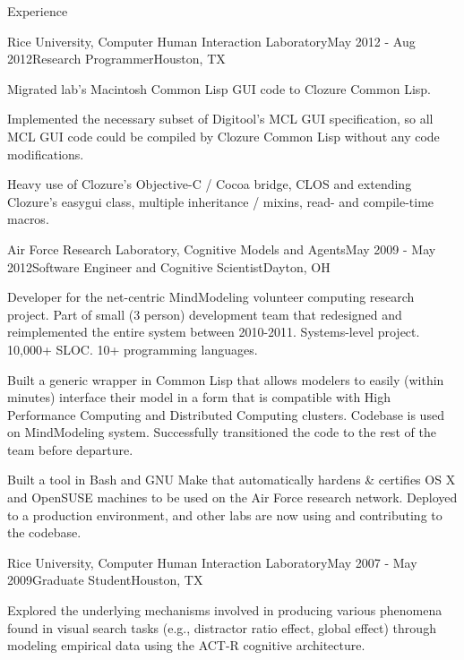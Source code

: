 \documentclass{resume} %
\begin{document}

\begin{rSection}{Experience}

\begin{rSubsection}{Rice University, Computer Human Interaction Laboratory}{May 2012 - Aug 2012}{Research Programmer}{Houston, TX}
\item Migrated lab's Macintosh Common Lisp GUI code to Clozure Common Lisp. 
\item Implemented the necessary subset of Digitool's MCL GUI specification, so all MCL GUI code could be compiled by Clozure Common Lisp without any code modifications.
\item Heavy use of Clozure's Objective-C / Cocoa bridge, CLOS and extending Clozure's easygui class, multiple inheritance / mixins, read- and compile-time macros.
\end{rSubsection}

\begin{rSubsection}{Air Force Research Laboratory, Cognitive Models and Agents}{May 2009 - May 2012}{Software Engineer and Cognitive Scientist}{Dayton, OH}
\item Developer for the net-centric MindModeling volunteer computing research project.
Part of small (3 person) development team that redesigned and reimplemented the entire system between 2010-2011.
Systems-level project. 10,000+ SLOC. 10+ programming languages.
\item Built a generic wrapper in Common Lisp that allows modelers to easily
(within minutes) interface their model in a form that is compatible with High Performance Computing and Distributed Computing clusters.
Codebase is used on MindModeling system.
Successfully transitioned the code to the rest of the team before departure.
\item Built a tool in Bash and GNU Make that automatically hardens \& certifies OS X and OpenSUSE machines to be used on the Air Force research network.
Deployed to a production environment, and other labs are now using and contributing to the codebase.
\end{rSubsection}

\begin{rSubsection}{Rice University, Computer Human Interaction Laboratory}{May 2007 - May 2009}{Graduate Student}{Houston, TX}
\item Explored the underlying mechanisms involved in producing various phenomena found in visual search tasks
(e.g., distractor ratio effect, global effect) through modeling empirical data using the ACT-R cognitive architecture. 
\end{rSubsection}


\end{rSection}
\end{document}
